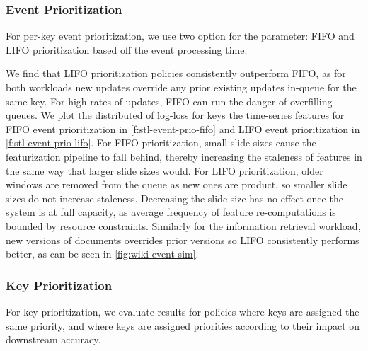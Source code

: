 
\subsubsection{Event Prioritization}
For per-key event prioritization, we use two option for the parameter: FIFO and LIFO prioritization based off the event processing time.

We find that LIFO prioritization policies consistently outperform FIFO, as for both workloads new updates override any prior existing updates in-queue for the same key. For high-rates of updates, FIFO can run the danger of overfilling queues. We plot the distributed of log-loss for keys the time-series features for FIFO event prioritization in \cref{f:stl-event-prio-fifo} and LIFO event prioritization in \cref{f:stl-event-prio-lifo}. For FIFO prioritization, small slide sizes cause the featurization pipeline to fall behind, thereby increasing the staleness of features in the same way that larger slide sizes would. For LIFO prioritization, older windows are removed from the queue as new ones are product, so smaller slide sizes do not increase staleness. Decreasing the slide size has no effect once the system is at full capacity, as average frequency of feature re-computations is bounded by resource constraints. Similarly for the information retrieval workload, new versions of documents overrides prior versions so LIFO consistently performs better, as can be seen in \cref{fig:wiki-event-sim}.





\subsubsection{Key Prioritization}
For key prioritization, we evaluate results for policies where keys are assigned the same priority, and where keys are assigned priorities according to their impact on downstream accuracy. 

